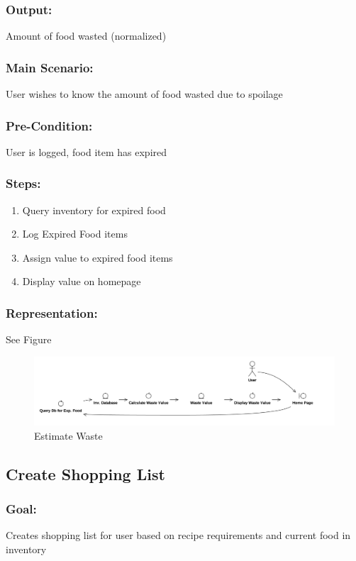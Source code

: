 		\subsubsection{Output:} Amount of food wasted (normalized)
		\subsubsection{Main Scenario:} User wishes to know the amount of food wasted due to spoilage
		\subsubsection{Pre-Condition:} User is logged, food item has expired
		\subsubsection{Steps:} 
		\begin{enumerate}
			\item Query inventory for expired food
			\item Log Expired Food items
			\item Assign value to expired food items
			\item Display value on homepage
		\end{enumerate}
		\subsubsection{Representation:} See Figure~\thesubsection
		\begin{figure}[p]
			\centering
			\includegraphics[width=\textwidth]{waste.png}
			\caption{Estimate Waste}
		\end{figure}

	\subsection{Create Shopping List}
		\subsubsection{Goal:} Creates shopping list for user based on recipe requirements and current food in inventory
